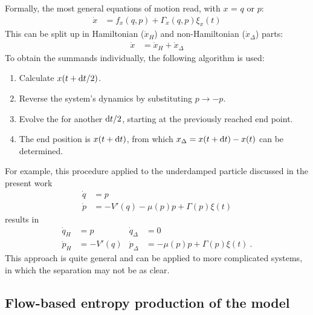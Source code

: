 Formally, the most general equations of motion read, with \(x\) = \(q\) or \(p\):
%
\begin{align}
	\dot x &= f_x(q,p) + \Gamma_x(q,p)\xi_x(t)
\end{align}
%
This can be split up in Hamiltonian (\(\dot x_H\)) and non-Hamiltonian (\(\dot x_\Delta\)) parts:
%
\begin{align}
	\dot x &= \dot x_H + \dot x_\Delta
\end{align}
%
To obtain the summands individually, the following algorithm is used:
%
\begin{enumerate}
	\item Calculate \(x(t+\mathrm{d} t/2) \).
	\item Reverse the system's dynamics by substituting \(p \to -p\).
	\item Evolve the for another \(\mathrm{d} t/2\), starting at the previously reached end point.
	\item The end position is \(x(t+\mathrm{d} t)\), from which \(x_\Delta = x(t+\mathrm{d} t) - x(t)\) can be determined.
\end{enumerate}
%
For example, this procedure applied to the underdamped particle discussed in the present work
%
\begin{align*}
	\dot q &= p \\
	\dot p &= -V'(q) - \mu(p)p + \Gamma(p)\xi(t)
\end{align*}
results in
\begin{align*}
	\dot q_H &= p  &  \dot q_\Delta &= 0 \\
	\dot p_H &= -V'(q)  &  \dot p_\Delta &= - \mu(p)p + \Gamma(p)\xi(t) ~.
\end{align*}
This approach is quite general and can be applied to more complicated systems, in which the separation may not be as clear.



\subsection{Flow-based entropy production of the model}

